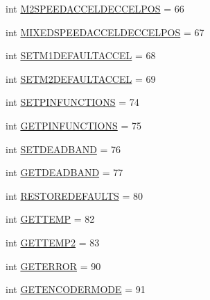 \begin{DoxyCompactItemize}
\item 
int \mbox{\hyperlink{classtoxic__hardware_1_1roboclaw__3_1_1Roboclaw_1_1Cmd_aaed56644583bf79cb5a8ac524a1840fe}{M2\+S\+P\+E\+E\+D\+A\+C\+C\+E\+L\+D\+E\+C\+C\+E\+L\+P\+OS}} = 66
\item 
int \mbox{\hyperlink{classtoxic__hardware_1_1roboclaw__3_1_1Roboclaw_1_1Cmd_a1f13642d0cbe61cac8c37933db3caaa9}{M\+I\+X\+E\+D\+S\+P\+E\+E\+D\+A\+C\+C\+E\+L\+D\+E\+C\+C\+E\+L\+P\+OS}} = 67
\item 
int \mbox{\hyperlink{classtoxic__hardware_1_1roboclaw__3_1_1Roboclaw_1_1Cmd_a898502c25733fb8c6600d1f7fe1ed878}{S\+E\+T\+M1\+D\+E\+F\+A\+U\+L\+T\+A\+C\+C\+EL}} = 68
\item 
int \mbox{\hyperlink{classtoxic__hardware_1_1roboclaw__3_1_1Roboclaw_1_1Cmd_aef523fcaaccb0d4b46c454aad8409f6b}{S\+E\+T\+M2\+D\+E\+F\+A\+U\+L\+T\+A\+C\+C\+EL}} = 69
\item 
int \mbox{\hyperlink{classtoxic__hardware_1_1roboclaw__3_1_1Roboclaw_1_1Cmd_a21de1355402084592bf9011dd1dd685c}{S\+E\+T\+P\+I\+N\+F\+U\+N\+C\+T\+I\+O\+NS}} = 74
\item 
int \mbox{\hyperlink{classtoxic__hardware_1_1roboclaw__3_1_1Roboclaw_1_1Cmd_affd5c91a77f76ff08e174f7be142e9eb}{G\+E\+T\+P\+I\+N\+F\+U\+N\+C\+T\+I\+O\+NS}} = 75
\item 
int \mbox{\hyperlink{classtoxic__hardware_1_1roboclaw__3_1_1Roboclaw_1_1Cmd_a360255e78cdf2698ef935e1aec23ea1a}{S\+E\+T\+D\+E\+A\+D\+B\+A\+ND}} = 76
\item 
int \mbox{\hyperlink{classtoxic__hardware_1_1roboclaw__3_1_1Roboclaw_1_1Cmd_abb63602ce7ad66ed6508a34b7de63199}{G\+E\+T\+D\+E\+A\+D\+B\+A\+ND}} = 77
\item 
int \mbox{\hyperlink{classtoxic__hardware_1_1roboclaw__3_1_1Roboclaw_1_1Cmd_aac722480a92502985d440290fbde1ab4}{R\+E\+S\+T\+O\+R\+E\+D\+E\+F\+A\+U\+L\+TS}} = 80
\item 
int \mbox{\hyperlink{classtoxic__hardware_1_1roboclaw__3_1_1Roboclaw_1_1Cmd_a7e82fb157825293cceff4b18c3f5cfa8}{G\+E\+T\+T\+E\+MP}} = 82
\item 
int \mbox{\hyperlink{classtoxic__hardware_1_1roboclaw__3_1_1Roboclaw_1_1Cmd_a4e5f0e214776e920d3dd49e0a30fae25}{G\+E\+T\+T\+E\+M\+P2}} = 83
\item 
int \mbox{\hyperlink{classtoxic__hardware_1_1roboclaw__3_1_1Roboclaw_1_1Cmd_af8e397f649987ab40d86b9a6c1cfdccc}{G\+E\+T\+E\+R\+R\+OR}} = 90
\item 
int \mbox{\hyperlink{classtoxic__hardware_1_1roboclaw__3_1_1Roboclaw_1_1Cmd_a9e6c1afdc1f26e5a950937f01357b116}{G\+E\+T\+E\+N\+C\+O\+D\+E\+R\+M\+O\+DE}} = 91

\end{DoxyCompactItemize}
